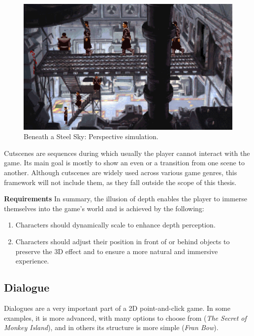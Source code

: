 \begin{figure}[H]
\centering
\includegraphics[width=.8\linewidth]{img/M-BaSS00.png}
\caption{Beneath a Steel Sky: Perspective simulation.}
\label{fig:M-BaSS0}
\end{figure}


\begin{notImplemented}
 \par
\vspace{3mm}
Cutscenes are sequences during which usually the player cannot interact with the game. Its main goal is mostly to show an even or a transition from one scene to another. Although cutscenes are widely used across various game genres, this framework will not include them, as they fall outside the scope of this thesis.
\end{notImplemented}

\textbf{Requirements} \quad In summary, the illusion of depth enables the player to immerse themselves into the game's world and is achieved by the following:

\begin{enumerate}[label=\color{teal}\textbf{R{\arabic*}},resume]
  \item \label{intro:req:scale} Characters should dynamically scale to enhance depth perception.
  \item \label{intro:req:layers} Characters should adjust their position in front of or behind objects to preserve the 3D effect and to ensure a more natural and immersive experience.
\end{enumerate}
    
\subsection{Dialogue}
\label{sec:Dialogue}
Dialogues are a very important part of a 2D point-and-click game. In some examples, it is more advanced, with many options to choose from (\textit{The Secret of Monkey Island}), and in others its structure is more simple (\textit{Fran Bow}).  

